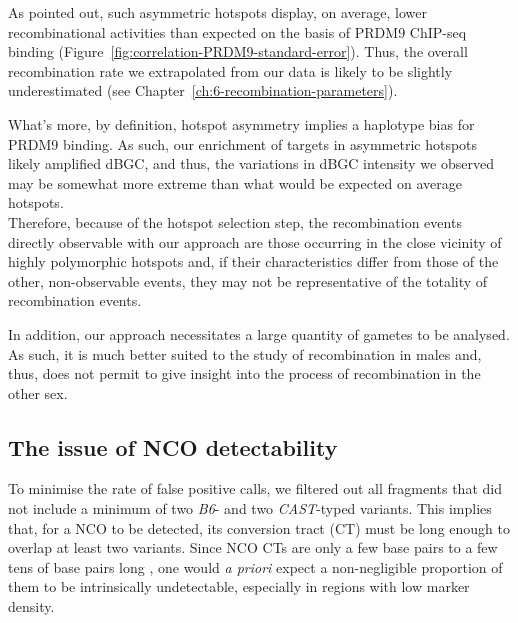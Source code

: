 As \citet{li2018highresolution} pointed out, such asymmetric hotspots display, on average, lower recombinational activities than expected on the basis of PRDM9 ChIP-seq binding (Figure~\ref{fig:correlation-PRDM9-standard-error}).
Thus, the overall recombination rate we extrapolated from our data is likely to be slightly underestimated (see Chapter~\ref{ch:6-recombination-parameters}).

What's more, by definition, hotspot asymmetry implies a haplotype bias for PRDM9 binding.
As such, our enrichment of targets in asymmetric hotspots likely amplified dBGC, and thus, the variations in dBGC intensity we observed may be somewhat more extreme than what would be expected on average hotspots.\\

Therefore, because of the hotspot selection step, the recombination events directly observable with our approach are those occurring in the close vicinity of highly polymorphic hotspots and, if their characteristics differ from those of the other, non-observable events, they may not be representative of the totality of recombination events.

In addition, our approach necessitates a large quantity of gametes to be analysed.
As such, it is much better suited to the study of recombination in males and, thus, does not permit to give insight into the process of recombination in the other sex.




\subsection{The issue of NCO detectability}

To minimise the rate of false positive calls, we filtered out all fragments that did not include a minimum of two \textit{B6}- and two \textit{CAST}-typed variants. 
This implies that, for a NCO to be detected, its conversion tract (CT) must be long enough to overlap at least two variants. 
Since NCO CTs are only a few base pairs to a few tens of base pairs long \citep{cole2014mouse}, one would \textit{a priori} expect a non-negligible proportion of them to be intrinsically undetectable, especially in regions with low marker density.

